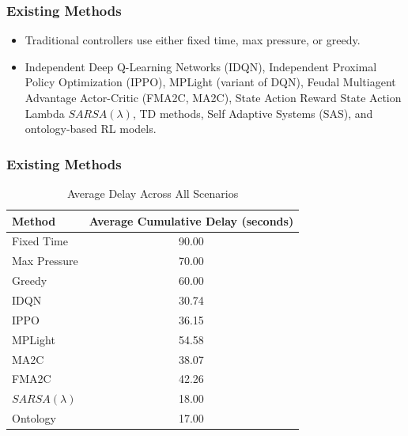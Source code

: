 \documentclass[compress,12pt]{beamer}
\begin{document}
\begin{frame}[bg=logo.png]
\end{frame}


\begin{frame}[bg=arguelles.png]
      \frametitle{Existing Methods}
      \begin{itemize}
      \item Traditional controllers use either fixed time, max pressure, or greedy\cite{ault2021reinforcement}\cite{Chen_Wei_Xu_Zheng_Yang_Xiong_Xu_Li_2020}.
      \item Independent Deep Q-Learning Networks (IDQN), Independent Proximal Policy Optimization (IPPO), MPLight (variant of DQN)\cite{Chen_Wei_Xu_Zheng_Yang_Xiong_Xu_Li_2020}, Feudal Multiagent Advantage Actor-Critic (FMA2C, MA2C)\cite{DBLP:journals/corr/abs-1903-04527}, State Action Reward State Action Lambda \(SARSA(\lambda)\), TD methods\cite{Reza2023}, Self Adaptive Systems (SAS), and ontology-based RL models\cite{Ghanadbashi2023}.
      \end{itemize}

\end{frame}

\begin{frame}[bg=arguelles.png]
      \frametitle{Existing Methods}

    \begin{table}[H]
    \centering
    \small
    \begin{tabular}{lc}
    \hline
    \textbf{Method} & \textbf{Average Cumulative Delay (seconds)} \\ \hline
    Fixed Time      & 90.00\footnotemark[2]  \\
    Max Pressure    & 70.00\footnotemark[2]  \\
    Greedy          & 60.00\footnotemark[2]  \\
    IDQN            & 30.74                  \\
    IPPO            & 36.15                  \\
    MPLight         & 54.58                  \\
    MA2C            & 38.07\footnotemark[1]                  \\
    FMA2C           & 42.26                  \\
    \(SARSA(\lambda)\)           & 18.00\footnotemark[2]                  \\
    Ontology        & 17.00\footnotemark[2]                  \\ \hline
    \end{tabular}
    \caption{Average Delay Across All Scenarios}
    \label{tab:avg_delay}
    \end{table}
\end{frame}
\end{document}
